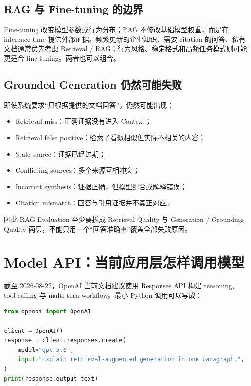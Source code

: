 \documentclass[profile=standard,twoside=false]{ipara-handbook}
\begin{document}
\begin{handbookdiagram}
\centering

\end{handbookdiagram}

\subsection{RAG 与 Fine-tuning 的边界}

Fine-tuning 改变模型参数或行为分布；RAG 不修改基础模型权重，而是在 inference time 提供外部证据。频繁更新的企业知识、需要 citation 的问答、私有文档通常优先考虑 Retrieval / RAG；行为风格、稳定格式和高频任务模式则可能更适合 fine-tuning。两者也可以组合。

\subsection{Grounded Generation 仍然可能失败}

即使系统要求“只根据提供的文档回答”，仍然可能出现：

\begin{itemize}
  \item Retrieval miss：正确证据没有进入 Context；
  \item Retrieval false positive：检索了看似相似但实际不相关的内容；
  \item Stale source：证据已经过期；
  \item Conflicting sources：多个来源互相冲突；
  \item Incorrect synthesis：证据正确，但模型组合或解释错误；
  \item Citation mismatch：回答与引用证据并不真正对应。
\end{itemize}

因此 RAG Evaluation 至少要拆成 Retrieval Quality 与 Generation / Grounding Quality 两层，不能只用一个“回答准确率”覆盖全部失败原因。

\section{Model API：当前应用层怎样调用模型}

截至 2026-08-22，OpenAI 当前文档建议使用 Responses API 构建 reasoning、tool-calling 与 multi-turn workflow。最小 Python 调用可以写成：

\begin{lstlisting}[language=Python]
from openai import OpenAI

client = OpenAI()
response = client.responses.create(
    model="gpt-5.6",
    input="Explain retrieval-augmented generation in one paragraph.",
)
print(response.output_text)
\end{lstlisting}
\end{document}
